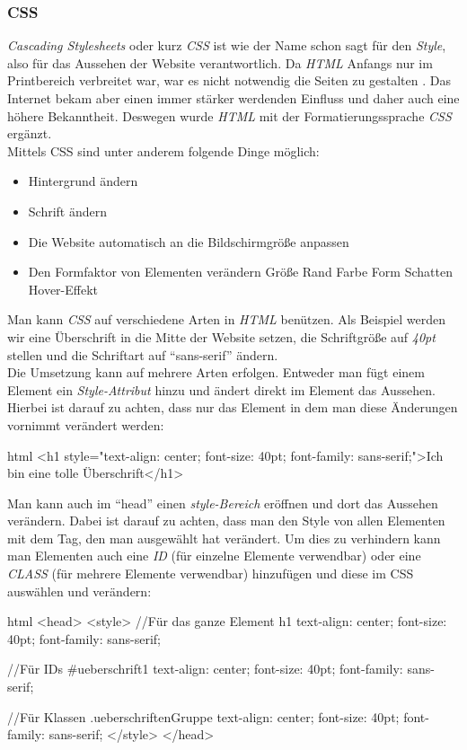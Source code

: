 		\subsubsection{CSS}
		\textit{Cascading Stylesheets} oder kurz \textit{CSS} ist wie der Name schon sagt für den \textit{Style}, also für das Aussehen der Website verantwortlich. Da \textit{HTML} Anfangs nur im Printbereich verbreitet war, war es nicht notwendig die Seiten zu gestalten \cite{html5-css3-def, html5-css3-handbuch}. Das Internet bekam aber einen immer stärker werdenden Einfluss und daher auch eine höhere Bekanntheit. Deswegen wurde \textit{HTML} mit der Formatierungssprache \textit{CSS} ergänzt.\\
		Mittels CSS sind unter anderem folgende Dinge möglich:
		\begin{itemize}
			\item Hintergrund ändern
			\item Schrift ändern
			\item Die Website automatisch an die Bildschirmgröße anpassen
			\item Den Formfaktor von Elementen verändern
			\subitem Größe
			\subitem Rand
			\subitem Farbe
			\subitem Form
			\subitem Schatten
			\subitem Hover-Effekt
		\end{itemize}
		Man kann \textit{CSS} auf verschiedene Arten in \textit{HTML} benützen. Als Beispiel werden wir eine Überschrift in die Mitte der Website setzen, die Schriftgröße auf \textit{40pt} stellen und die Schriftart auf \enquote{sans-serif} ändern.\\
		Die Umsetzung kann auf mehrere Arten erfolgen. Entweder man fügt einem Element ein \textit{Style-Attribut} hinzu und ändert direkt im Element das Aussehen. Hierbei ist darauf zu achten, dass nur das Element in dem man diese Änderungen vornimmt verändert werden:
		\begin{code}{html}
			<h1 style="text-align: center; font-size: 40pt; font-family: sans-serif;">Ich bin eine tolle Überschrift</h1>
		\end{code}
		Man kann auch im \enquote{head} einen \textit{style-Bereich} eröffnen und dort das Aussehen verändern. Dabei ist darauf zu achten, dass man den Style von allen Elementen mit dem Tag, den man ausgewählt hat verändert. Um dies zu verhindern kann man Elementen auch eine \textit{ID} (für einzelne Elemente verwendbar) oder eine \textit{CLASS} (für mehrere Elemente verwendbar) hinzufügen und diese im CSS auswählen und verändern:
		\begin{code}{html}
				<head>
					<style>
					//Für das ganze Element
					h1 {
						text-align: center; 
						font-size: 40pt; 
						font-family: sans-serif;
					}
				
					//Für IDs
					#ueberschrift1 {
						text-align: center; 
						font-size: 40pt; 
						font-family: sans-serif;
					}
					
					//Für Klassen
					.ueberschriftenGruppe {
						text-align: center; 
						font-size: 40pt; 
						font-family: sans-serif;
					}
					</style>
				</head>
		\end{code}
